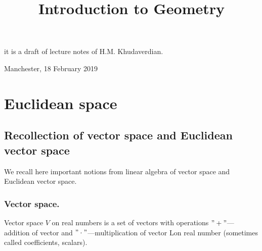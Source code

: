 \documentclass[12pt]{article}
\title{Introduction to  Geometry}
\date{}
\numberwithin{equation}{section}
\begin{document}
\maketitle

  \centerline {it is a draft of lecture notes of H.M. Khudaverdian.}

  \centerline { Manchester, 18 February 2019}

\tableofcontents
{}

\newpage
\section {Euclidean space}

\subsection{Recollection of vector space and Euclidean vector
space}

We recall here important notions from linear algebra
of vector space and Euclidean vector space.


\subsubsection {Vector space.}


\bigskip

Vector space $V$ on real numbers is a set of 
vectors with operations
$"+"$---addition of vector and 
$"\cdot"$---multiplication of vector
Lon real number (sometimes called coefficients, scalars). 

\m
\end{document}
